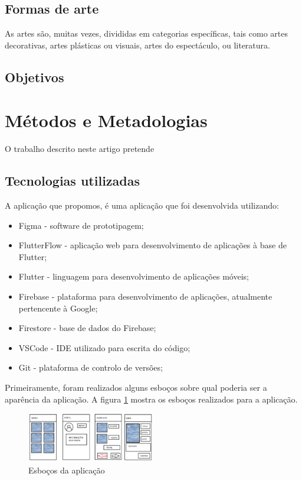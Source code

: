 \documentclass[conference]{IEEEtran}
\begin{document}
\subsection{Formas de arte}
As artes são, muitas vezes, divididas em categorias específicas, tais como artes decorativas, 
artes plásticas ou visuais, artes do espectáculo, ou literatura.

\subsection{Objetivos}

\section{Métodos e Metadologias}

O trabalho descrito neste artigo pretende 

\subsection{Tecnologias utilizadas}

A aplicação que propomos, é uma aplicação que foi desenvolvida utilizando:

\begin{itemize}
    \item Figma - software de prototipagem;
    \item FlutterFlow - aplicação web para desenvolvimento de aplicações à base de Flutter;
    \item Flutter - linguagem para desenvolvimento de aplicações móveis;
    \item Firebase - plataforma para desenvolvimento de aplicações, atualmente pertencente à Google;
    \item Firestore - base de dados do Firebase;
    \item VSCode - IDE utilizado para escrita do código;
    \item Git - plataforma de controlo de versões;
\end{itemize}

Primeiramente, foram realizados alguns esboços sobre qual poderia ser a aparência da aplicação. A figura \ref{fig:sketches} 
mostra os esboços realizados para a aplicação.

\begin{figure}[h]
    \centering
    \includegraphics[width=0.5\textwidth]{appsketches.png}
    \caption{Esboços da aplicação}
    \label{fig:sketches}
\end{figure}
\end{document}
